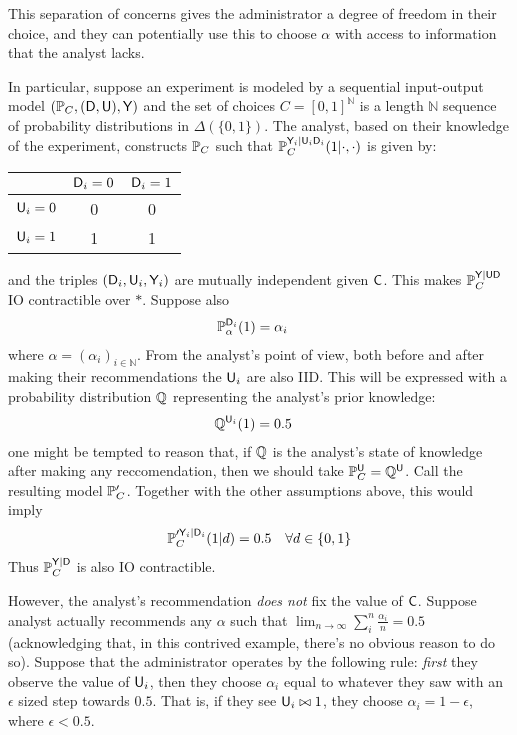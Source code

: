 This separation of concerns gives the administrator a degree of freedom in their choice, and they can potentially use this to choose $\alpha$ with access to information that the analyst lacks.

In particular, suppose an experiment is modeled by a sequential input-output model $(\mathbb{P}_C,(\mathsf{D},\mathsf{U}),\mathsf{Y})$ and the set of choices $C=[0,1]^{\mathbb{N}}$ is a length $\mathbb{N}$ sequence of probability distributions in $\Delta(\{0,1\})$. The analyst, based on their knowledge of the experiment, constructs $\mathbb{P}_C$ such that $\mathbb{P}_C^{\mathsf{Y}_i|\mathsf{U}_i\mathsf{D}_i}(1|\cdot,\cdot)$ is given by:
\begin{center}
\begin{tabular}{ c | c | c }
  & $\mathsf{D}_i=0$ & $\mathsf{D}_i=1$ \\\hline 
 $\mathsf{U}_i=0$ & 0 & 0 \\ \hline 
 $\mathsf{U}_i=1$ & 1 & 1   
\end{tabular}
\end{center}
and the triples $(\mathsf{D}_i,\mathsf{U}_i,\mathsf{Y}_i)$ are mutually independent given $\mathsf{C}$. This makes $\mathbb{P}_C^{\mathsf{Y}|\mathsf{UD}}$ IO contractible over $*$. Suppose also 
\begin{align}
    \mathbb{P}_\alpha^{\mathsf{D}_i}(1) &= \alpha_i
\end{align}
where $\alpha=(\alpha_i)_{i\in\mathbb{N}}$. From the analyst's point of view, both before and after making their recommendations the $\mathsf{U}_i$ are also IID. This will be expressed with a probability distribution $\mathbb{Q}$ representing the analyst's prior knowledge:
\begin{align}
    \mathbb{Q}^{\mathsf{U}_i}(1) &= 0.5
\end{align}
one might be tempted to reason that, if $\mathbb{Q}$ is the analyst's state of knowledge after making any reccomendation, then we should take $\mathbb{P}_C^{\mathsf{U}}=\mathbb{Q}^{\mathsf{U}}$. Call the resulting model $\mathbb{P}_C'$. Together with the other assumptions above, this would imply
\begin{align}
    \mathbb{P}_C^{\prime \mathsf{Y}_i|\mathsf{D}_i}(1|d) &= 0.5 & \forall d\in \{0,1\}
\end{align}
Thus $\mathbb{P}_C^{\mathsf{Y}|\mathsf{D}}$ is also IO contractible.

However, the analyst's recommendation \emph{does not} fix the value of $\mathsf{C}$. Suppose analyst actually recommends any $\alpha$ such that $\lim_{n\to\infty} \sum_i^n \frac{\alpha_i}{n} = 0.5$ (acknowledging that, in this contrived example, there's no obvious reason to do so). Suppose that the administrator operates by the following rule: \emph{first} they observe the value of $\mathsf{U}_i$, then they choose $\alpha_i$ equal to whatever they saw with an $\epsilon$ sized step towards $0.5$. That is, if they see $\mathsf{U}_i\bowtie 1$, they choose $\alpha_i=1-\epsilon$, where $\epsilon < 0.5$.

